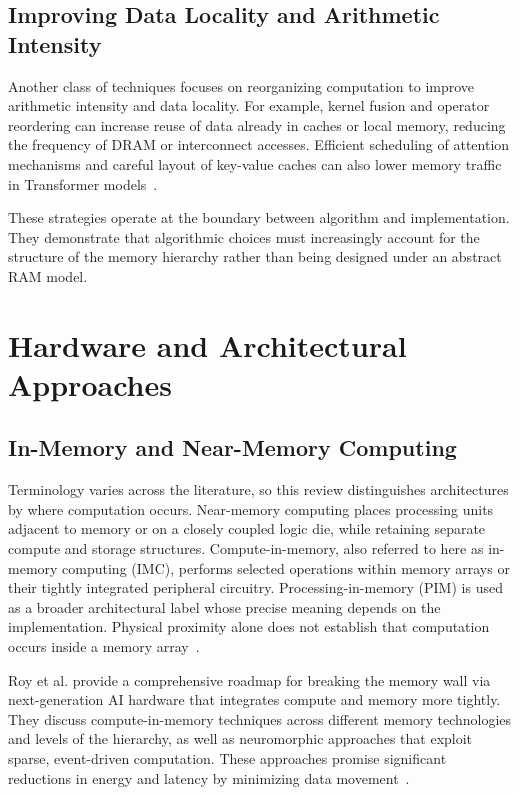 \documentclass[conference]{IEEEtran}
\begin{document}
\subsection{Improving Data Locality and Arithmetic Intensity}

Another class of techniques focuses on reorganizing computation to improve arithmetic intensity and data locality. For example, kernel fusion and operator reordering can increase reuse of data already in caches or local memory, reducing the frequency of DRAM or interconnect accesses. Efficient scheduling of attention mechanisms and careful layout of key-value caches can also lower memory traffic in Transformer models~\cite{gholami2024ai}.

These strategies operate at the boundary between algorithm and implementation. They demonstrate that algorithmic choices must increasingly account for the structure of the memory hierarchy rather than being designed under an abstract RAM model.

\section{Hardware and Architectural Approaches}
\label{sec:hardware}

\subsection{In-Memory and Near-Memory Computing}

Terminology varies across the literature, so this review distinguishes architectures by where computation occurs. Near-memory computing places processing units adjacent to memory or on a closely coupled logic die, while retaining separate compute and storage structures. Compute-in-memory, also referred to here as in-memory computing (IMC), performs selected operations within memory arrays or their tightly integrated peripheral circuitry. Processing-in-memory (PIM) is used as a broader architectural label whose precise meaning depends on the implementation. Physical proximity alone does not establish that computation occurs inside a memory array~\cite{bavikadi2020review,mittal2021survey,sunrise2020}.

Roy et al. provide a comprehensive roadmap for breaking the memory wall via next-generation AI hardware that integrates compute and memory more tightly. They discuss compute-in-memory techniques across different memory technologies and levels of the hierarchy, as well as neuromorphic approaches that exploit sparse, event-driven computation. These approaches promise significant reductions in energy and latency by minimizing data movement~\cite{roy2025breaking}.
\end{document}
